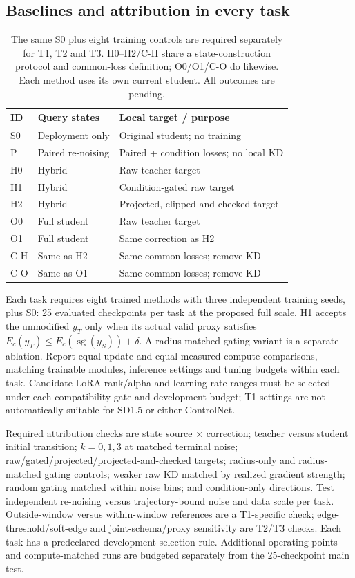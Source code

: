 \documentclass[11pt]{article}
\newcommand{\sg}{\operatorname{sg}}
\begin{document}
\subsection{Baselines and attribution in every task}
\begin{table}[t]
\centering\small
\begin{tabular}{lll}
\toprule
ID & Query states & Local target / purpose\\
\midrule
S0 & Deployment only & Original student; no training\\
P & Paired re-noising & Paired + condition losses; no local KD\\
H0 & Hybrid & Raw teacher target\\
H1 & Hybrid & Condition-gated raw target\\
H2 & Hybrid & Projected, clipped and checked target\\
O0 & Full student & Raw teacher target\\
O1 & Full student & Same correction as H2\\
C-H & Same as H2 & Same common losses; remove KD\\
C-O & Same as O1 & Same common losses; remove KD\\
\bottomrule
\end{tabular}
\caption{The same S0 plus eight training controls are required separately for T1, T2 and T3. H0--H2/C-H share a state-construction protocol and common-loss definition; O0/O1/C-O do likewise. Each method uses its own current student. All outcomes are pending.}
\end{table}
Each task requires eight trained methods with three independent training seeds, plus S0: 25 evaluated checkpoints per task at the proposed full scale. H1 accepts the unmodified $y_T$ only when its actual valid proxy satisfies $E_c(y_T)\le E_c(\sg(y_S))+\delta$. A radius-matched gating variant is a separate ablation. Report equal-update and equal-measured-compute comparisons, matching trainable modules, inference settings and tuning budgets within each task. Candidate LoRA rank/alpha and learning-rate ranges must be selected under each compatibility gate and development budget; T1 settings are not automatically suitable for SD1.5 or either ControlNet.

Required attribution checks are state source $\times$ correction; teacher versus student initial transition; $k=0,1,3$ at matched terminal noise; raw/gated/projected/projected-and-checked targets; radius-only and radius-matched gating controls; weaker raw KD matched by realized gradient strength; random gating matched within noise bins; and condition-only directions. Test independent re-noising versus trajectory-bound noise and data scale per task. Outside-window versus within-window references are a T1-specific check; edge-threshold/soft-edge and joint-schema/proxy sensitivity are T2/T3 checks. Each task has a predeclared development selection rule. Additional operating points and compute-matched runs are budgeted separately from the 25-checkpoint main test.
\end{document}
